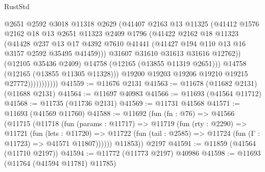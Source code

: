 \begin{lexlean}{RustStd}
\begin{coremodule}
                              @2651
                              @2592
                              @3018
                              @11318
                              @2629
                              (@41407
                                @2163
                                @13
                                @11325
                                (@41412
                                  @1576
                                  @2162
                                  @18
                                  @13
                                  @2651
                                  @11323
                                  @2409
                                  @1796
                                  (@41422
                                    @2162
                                    @18
                                    @11323
                                    (@41428
                                      @237
                                      @13
                                      @17
                                      @4392
                                      @7610
                                      @41441
                                      (@41427 @194 @110 @13 @16 @3157 @2592 @35495 @41459)))
                                  @31607
                                  @31610
                                  @31613
                                  @31616
                                  @12762))
                              (@12105 @35436 @2409)
                              @14758
                              (@12165 (@13855 @11319 @2651)))
                            @14758
                            (@12165 (@13855 @11305 @11328)))
                          @19200
                          @19203
                          @19206
                          @19210
                          @19215
                          @27772)))))))))))
@41559 := @11676 @2131
@41563 := @11678 (@11682 @2131) (@11688 @2131)
@41564 := @11697 @40983
@41566 := @11693 (@41564 @11712)
@41568 := @11735 (@11736 @2131)
@41569 := @11731 @41568
@41571 := @11693 (@41569 @11760)
@41588 := @11692
    (fun (fn : @76) =>
    @41566
      (@11715
        (@11718
          (fun (params : @11717) =>
          @11719
            (fun (rty : @2290) =>
            @11721
              (fun (lets : @11720) =>
              @11722 (fun (tail : @2585) => @11724 (fun (Γ : @11723) => @41571 @11807))))))
        @11853))
    @2197
@41591 := @11859 (@41564 (@11710 @2197))
@41594 := @11772 (@11773 @2197) @40986
@41598 := @11693 (@11764 (@41594 @11781) @11785)

\end{coremodule}
\end{lexlean}
